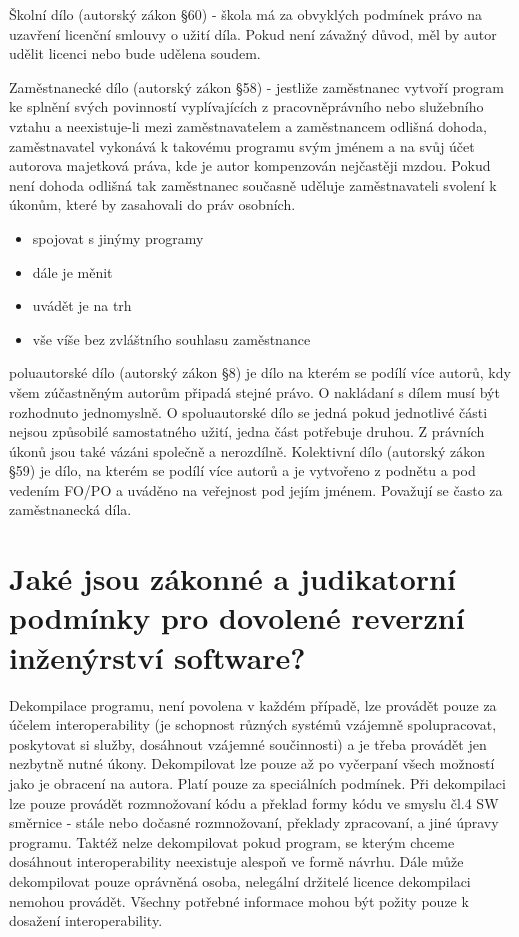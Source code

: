 \documentclass[12pt,a4paper,czech]{article}
\newcommand{\nadpis}[1]{{\section{#1}}}
\begin{document}
Školní dílo (autorský zákon §60) - škola má za obvyklých podmínek právo na uzavření licenční smlouvy o užití díla. Pokud není závažný důvod, měl by autor udělit licenci nebo bude udělena soudem.

Zaměstnanecké dílo (autorský zákon §58) - jestliže zaměstnanec vytvoří program ke splnění svých povinností vyplívajících z pracovněprávního nebo služebního vztahu a neexistuje-li mezi zaměstnavatelem a zaměstnancem odlišná dohoda, zaměstnavatel vykonává k takovému programu svým jménem a na svůj účet autorova majetková práva, kde je autor kompenzován nejčastěji mzdou. Pokud není dohoda odlišná tak zaměstnanec současně uděluje zaměstnavateli svolení k úkonům, které by zasahovali do práv osobních.
\begin{itemize}
    \setlength\itemsep{0em}
    \item spojovat s jinýmy programy
    \item dále je měnit 
    \item uvádět je na trh
    \item vše víše bez zvláštního souhlasu zaměstnance
\end{itemize}

poluautorské dílo (autorský zákon §8) je dílo na kterém se podílí více autorů, kdy všem zúčastněným autorům připadá stejné právo. O nakládaní s dílem musí být rozhodnuto jednomyslně. O spoluautorské dílo se jedná pokud jednotlivé části nejsou způsobilé samostatného užití, jedna část potřebuje druhou. Z právních úkonů jsou také vázáni společně a nerozdílně.
Kolektivní dílo (autorský zákon §59) je dílo, na kterém se podílí více autorů a je vytvořeno z podnětu a pod vedením FO/PO a uváděno na veřejnost pod jejím jménem. Považují se často za zaměstnanecká díla.

\vspace{0.5cm} 
\nadpis{Jaké jsou zákonné a judikatorní podmínky pro dovolené reverzní inženýrství software?}

Dekompilace programu, není povolena v každém případě, lze provádět pouze za účelem interoperability (je schopnost různých systémů vzájemně spolupracovat, poskytovat si služby, dosáhnout vzájemné součinnosti) a je třeba provádět jen nezbytně nutné úkony. Dekompilovat lze pouze až po vyčerpaní všech možností jako je obracení na autora. Platí pouze za speciálních podmínek. Při dekompilaci lze pouze provádět rozmnožovaní kódu a překlad formy kódu ve smyslu čl.4 SW směrnice - stále nebo dočasné rozmnožovaní, překlady zpracovaní, a jiné úpravy programu. Taktéž nelze dekompilovat pokud program, se kterým chceme dosáhnout interoperability neexistuje alespoň ve formě návrhu. Dále může dekompilovat pouze oprávněná osoba, nelegální držitelé licence dekompilaci nemohou provádět. Všechny potřebné informace mohou být požity pouze k dosažení interoperability. 
\end{document}
